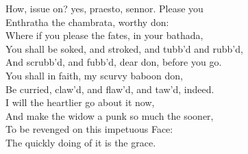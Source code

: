 \documentclass[a4paper,oneside]{memoir}
\begin{document}
\begin{drama*}
\subtlespeaks How, issue on? yes, praesto, sennor. Please you\\
Enthratha the chambrata, worthy don:\\
Where if you please the fates, in your bathada,\\
You shall be soked, and stroked, and tubb'd and rubb'd,\\
And scrubb'd, and fubb'd, dear don, before you go.\\
You shall in faith, my scurvy baboon don,\\
Be curried, claw'd, and flaw'd, and taw'd, indeed.\\
I will the heartlier go about it now,\\
And make the widow a punk so much the sooner,\\
To be revenged on this impetuous Face:\\
The quickly doing of it is the grace.\\
\scene


\end{drama*}
\end{document}
